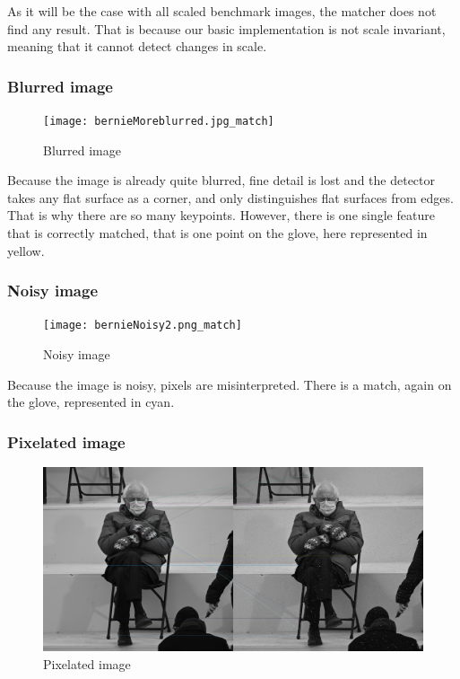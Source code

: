 \documentclass[12pt,a4paper]{report}
\begin{document}
As it will be the case with all scaled benchmark images, the matcher does not find any result. That is because our basic implementation is not scale invariant, meaning that it cannot detect changes in scale.

\clearpage
\subsubsection*{Blurred image}

\begin{figure}[ht]
	\centering
	\texttt{[image: bernieMoreblurred.jpg\_match]}
	\caption{Blurred image}
\end{figure}

Because the image is already quite blurred, fine detail is lost and the detector takes any flat surface as a corner, and only distinguishes flat surfaces from edges. That is why there are so many keypoints. However, there is one single feature that is correctly matched, that is one point on the glove, here represented in yellow.

\clearpage
\subsubsection*{Noisy image}

\begin{figure}[ht]
	\centering
	\texttt{[image: bernieNoisy2.png\_match]}
	\caption{Noisy image}
\end{figure}

Because the image is noisy, pixels are misinterpreted. There is a match, again on the glove, represented in cyan.

\clearpage
\subsubsection*{Pixelated image}

\begin{figure}[ht]
	\centering
	\includegraphics[width=\textwidth]{berniePixelated2.png_match}
	\caption{Pixelated image}
\end{figure}
\end{document}
